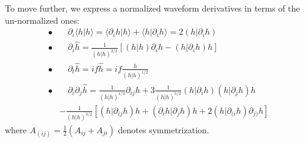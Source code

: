 \documentclass[twocolumn,showpacs,preprintnumbers,nofootinbib,prd,
superscriptaddress,10pt]{revtex4-2}
\newcommand{\scalar}[2]{\langle #1|#2 \rangle}
\newcommand{\rescalar}[2]{( #1 |#2 )}
\begin{document}
To move further, we express a normalized waveform derivatives in terms of the un-normalized ones:
\begin{align*}
	\bullet&\quad \partial_i \scalar{h}{h} = \scalar{\partial_i h}{h}+ \scalar{h}{\partial_i h} = 2 \rescalar{h}{\partial_i h} \\
	\bullet&\quad \partial_i \hat{h} =\frac{1}{\rescalar{h}{h}^{3/2}} \left[ \rescalar{h}{h}\partial_i h -  \rescalar{h}{\partial_i h} h \right]
	\\
	\bullet &\quad \partial_t \hat{h} = i f \hat{h} = i f \frac{h}{\rescalar{h}{h}^{1/2}} \\
	\bullet &\quad \partial_i \partial_j \hat{h} = \frac{1}{\rescalar{h}{h}^{1/2}} \partial_{ij}h 	+3 \frac{1}{\rescalar{h}{h}^{5/2}} \rescalar{h}{\partial_i h}\rescalar{h}{\partial_j h}h \\
	&- \frac{1}{\rescalar{h}{h}^{3/2}} \left[\rescalar{h}{ \partial_{ij} h} h + \rescalar{\partial_i h}{\partial_j h}  h
		+2\rescalar{h}{\partial_{(i} h} \partial_{j)} h \right]
\end{align*}
where $A_{(ij)} = \frac{1}{2}(A_{ij}+A_{ji})$ denotes symmetrization.
\end{document}
